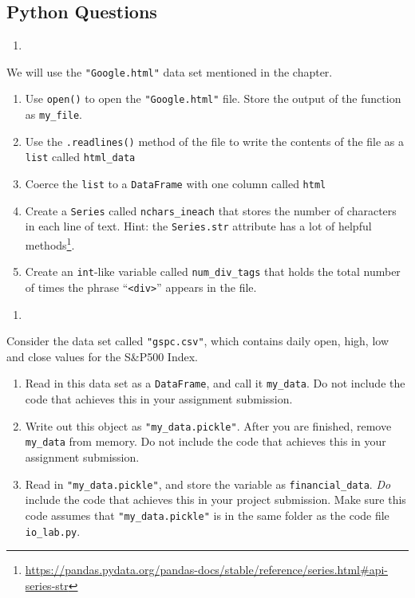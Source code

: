 \documentclass[12pt,krantz2]{krantz}
\providecommand{\tightlist}{%
  \setlength{\itemsep}{0pt}\setlength{\parskip}{0pt}}
\renewcommand{\href}[2]{#2\footnote{\url{#1}}}
\begin{document}
\hypertarget{python-questions-7}{%
\subsection{Python Questions}\label{python-questions-7}}

\begin{enumerate}
\def\labelenumi{\arabic{enumi}.}
\item
\end{enumerate}

We will use the \texttt{"Google.html"} data set mentioned in the chapter.

\begin{enumerate}
\def\labelenumi{\alph{enumi})}
\tightlist
\item
  Use \texttt{open()} to open the \texttt{"Google.html"} file. Store the output of the function as \texttt{my\_file}.
\item
  Use the \texttt{.readlines()} method of the file to write the contents of the file as a \texttt{list} called \texttt{html\_data}
\item
  Coerce the \texttt{list} to a \texttt{DataFrame} with one column called \texttt{html}
\item
  Create a \texttt{Series} called \texttt{nchars\_ineach} that stores the number of characters in each line of text. Hint: the \href{https://pandas.pydata.org/pandas-docs/stable/reference/series.html\#api-series-str}{\texttt{Series.str} attribute has a lot of helpful methods}.
\item
  Create an \texttt{int}-like variable called \texttt{num\_div\_tags} that holds the total number of times the phrase ``\texttt{\textless{}div\textgreater{}}'' appears in the file.
\end{enumerate}

\begin{enumerate}
\def\labelenumi{\arabic{enumi}.}
\setcounter{enumi}{1}
\item
\end{enumerate}

Consider the data set called \texttt{"gspc.csv"}, which contains daily open, high, low and close values for the S\&P500 Index.

\begin{enumerate}
\def\labelenumi{\alph{enumi})}
\tightlist
\item
  Read in this data set as a \texttt{DataFrame}, and call it \texttt{my\_data}. Do not include the code that achieves this in your assignment submission.
\item
  Write out this object as \texttt{"my\_data.pickle"}. After you are finished, remove \texttt{my\_data} from memory. Do not include the code that achieves this in your assignment submission.
\item
  Read in \texttt{"my\_data.pickle"}, and store the variable as \texttt{financial\_data}. \emph{Do} include the code that achieves this in your project submission. Make sure this code assumes that \texttt{"my\_data.pickle"} is in the same folder as the code file \texttt{io\_lab.py}.
\end{enumerate}
\end{document}
